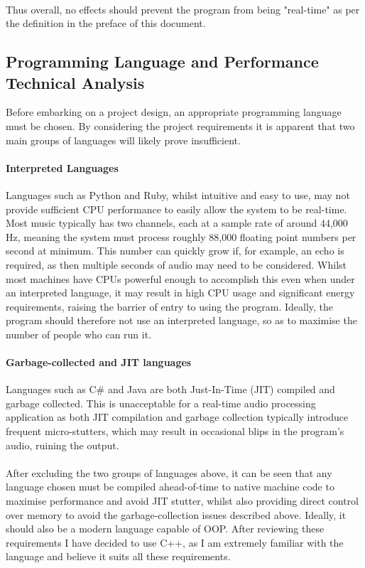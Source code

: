 \paragraph{}
Thus overall, no effects should prevent the program from being "real-time" as per the definition in the preface of this document.

\pagebreak
\subsection{Programming Language  and Performance Technical Analysis}
Before embarking on a project design, an appropriate programming language must be chosen. By considering the project requirements it is apparent that two main groups of languages will likely prove insufficient.

\paragraph{Interpreted Languages}
Languages such as Python and Ruby, whilst intuitive and easy to use, may not provide sufficient CPU performance to easily allow the system to be real-time. Most music typically has two channels, each at a sample rate of around 44,000 Hz, meaning the system must process roughly 88,000 floating point numbers per second at minimum. This number can quickly grow if, for example, an echo is required, as then multiple seconds of audio may need to be considered. Whilst most machines have CPUs powerful enough to accomplish this even when under an interpreted language, it may result in high CPU usage and significant energy requirements, raising the barrier of entry to using the program. Ideally, the program should therefore not use an interpreted language, so as to maximise the number of people who can run it.

\paragraph{Garbage-collected and JIT languages}
Languages such as C\# and Java are both Just-In-Time  (JIT) compiled and garbage collected.  This is unacceptable for a real-time audio processing application as both JIT compilation and garbage collection typically introduce frequent micro-stutters, which may result in occasional blips in the program's audio, ruining the output.

\paragraph{}
After excluding the two groups of languages above, it can be seen that any language chosen must be compiled ahead-of-time to native machine code to maximise performance and avoid JIT stutter, whilst also providing direct control over memory to avoid the garbage-collection issues described above. Ideally, it should also be a modern language capable of OOP. After reviewing these requirements I have decided to use C++, as I am extremely familiar with the language and believe it suits all these requirements.

